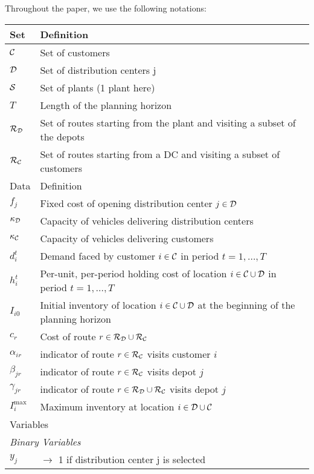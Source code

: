 \documentclass[10pt, a4paper]{article}
\begin{document}
Throughout the paper, we use the following notations:
\begin{table}
    \centering
    \begin{tabular}{ll}
        \hline
        Set & Definition \\
        \hline
        $\mathcal{C}$ & Set of customers \\ 
        $\mathcal{D}$ & Set of distribution centers j \\
        $\mathcal{S}$ & Set of plants (1 plant here)\\
        $T$ & Length of the planning horizon\\
        $\mathcal{R_D}$ & Set of routes starting from the plant and visiting a subset of the depots\\
        $\mathcal{R_C}$ & Set of routes starting from a DC and visiting a subset of customers\\
        \hline
        \hline
        Data & Definition \\
        \hline
        $f_j$ & Fixed cost of opening distribution center $j\in\mathcal{D}$\\ 
        $\kappa_{\mathcal{D}}$ & Capacity of vehicles delivering distribution centers\\ 
        $\kappa_{\mathcal{C}}$ & Capacity of vehicles delivering customers\\ 
        $d^t_i$ & Demand faced by customer $i\in\mathcal{C}$ in period $t=1,\ldots,T$\\
        $h^t_i$ & Per-unit, per-period holding cost of location $i\in\mathcal{C}\cup\mathcal{D}$ in period $t=1,\ldots, T$\\
        $I_{i0}$ & Initial inventory of location $i\in \mathcal{C}\cup\mathcal{D}$ at the beginning of the planning horizon\\
        $c_r$ & Cost of route $r\in \mathcal{R_D}\cup\mathcal{R_C}$\\
        $\alpha_{ir}$ & indicator of route $r\in\mathcal{R_C}$ visits customer $i$\\
        $\beta_{jr}$ & indicator of route $r\in\mathcal{R_C}$ visits depot $j$\\
        $\gamma_{jr}$ & indicator of route $r\in\mathcal{R_D}\cup\mathcal{R_C}$ visits depot $j$\\
        $I_i^{\max}$ & Maximum inventory at location $i\in\mathcal{D}\cup\mathcal{C}$\\
        \hline
        \hline
        \multicolumn{2}{l}{Variables}\\
        \hline
        \multicolumn{2}{l}{\textit{Binary Variables}}\\
        $y_j$ & $\rightarrow$ 1 if distribution center j is selected \\

\end{tabular}
\end{table}
\end{document}

